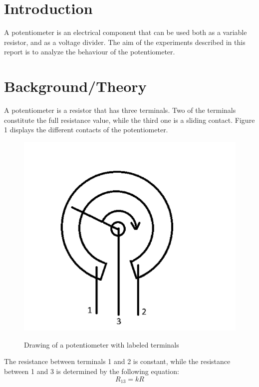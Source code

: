 \documentclass[a4paper]{article}
\begin{document}
\section{Introduction}
A potentiometer is an electrical component that can be used both as a variable
resistor, and as a voltage divider. The aim of the experiments described in this
report is to analyze the behaviour of the potentiometer.
\section{Background/Theory}
A potentiometer is a resistor that has three terminals. Two of the terminals
constitute the full resistance value, while the third one is a sliding contact.
Figure 1 displays the different contacts of the potentiometer.
\begin{figure}[!ht]
    \centering
    \begin{minipage}{0.4\textwidth}
        \includegraphics[width = \textwidth]{potterminals.png}
       \label{fig:1}
        \caption{\centering Drawing of a potentiometer with labeled terminals}    
    \end{minipage}
\end{figure}

The resistance between terminals 1 and 2 is constant, while the resistance
between 1 and 3 is determined by the following equation:
\begin{equation}
    R_{13} = kR
\end{equation}
\end{document}
